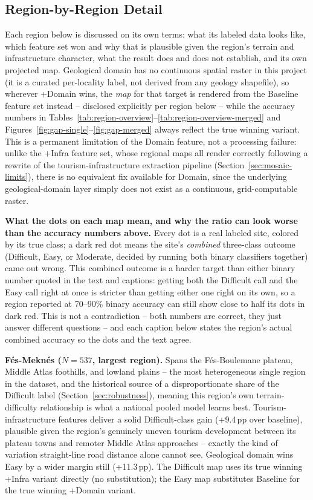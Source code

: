 \documentclass[11pt,a4paper]{article}
\begin{document}
\subsection{Region-by-Region Detail}
\label{sec:region-detail}
Each region below is discussed on its own terms: what its labeled data looks like, which feature set won and why that is plausible given the region's terrain and infrastructure character, what the result does and does not establish, and its own projected map. Geological domain has no continuous spatial raster in this project (it is a curated per-locality label, not derived from any geology shapefile), so wherever +Domain wins, the \emph{map} for that target is rendered from the Baseline feature set instead -- disclosed explicitly per region below -- while the accuracy numbers in Tables~\ref{tab:region-overview}--\ref{tab:region-overview-merged} and Figures~\ref{fig:gap-single}--\ref{fig:gap-merged} always reflect the true winning variant. This is a permanent limitation of the Domain feature, not a processing failure: unlike the +Infra feature set, whose regional maps all render correctly following a rewrite of the tourism-infrastructure extraction pipeline (Section~\ref{sec:mosaic-limits}), there is no equivalent fix available for Domain, since the underlying geological-domain layer simply does not exist as a continuous, grid-computable raster.

\textbf{What the dots on each map mean, and why the ratio can look worse than the accuracy numbers above.} Every dot is a real labeled site, colored by its true class; a dark red dot means the site's \emph{combined} three-class outcome (Difficult, Easy, or Moderate, decided by running both binary classifiers together) came out wrong. This combined outcome is a harder target than either binary number quoted in the text and captions: getting both the Difficult call and the Easy call right at once is stricter than getting either one right on its own, so a region reported at 70--90\% binary accuracy can still show close to half its dots in dark red. This is not a contradiction -- both numbers are correct, they just answer different questions -- and each caption below states the region's actual combined accuracy so the dots and the text agree.

\textbf{Fés-Meknés ($N=537$, largest region).} Spans the Fés-Boulemane plateau, Middle Atlas foothills, and lowland plains -- the most heterogeneous single region in the dataset, and the historical source of a disproportionate share of the Difficult label (Section~\ref{sec:robustness}), meaning this region's own terrain-difficulty relationship is what a national pooled model learns best. Tourism-infrastructure features deliver a solid Difficult-class gain (+9.4\,pp over baseline), plausible given the region's genuinely uneven tourism development between its plateau towns and remoter Middle Atlas approaches -- exactly the kind of variation straight-line road distance alone cannot see. Geological domain wins Easy by a wider margin still (+11.3\,pp). The Difficult map uses its true winning +Infra variant directly (no substitution); the Easy map substitutes Baseline for the true winning +Domain variant.
\end{document}
